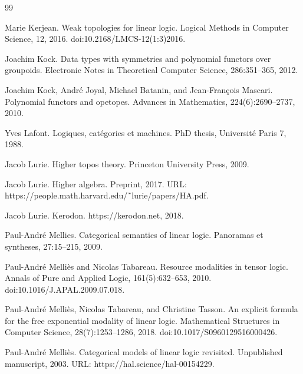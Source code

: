 \begin{thebibliography}{99}
\par\noindent    Marie Kerjean.  Weak topologies for linear logic.  Logical Methods in Computer Science, 12, 2016.  doi:10.2168/LMCS-12(1:3)2016.  

\par\noindent    Joachim Kock.  Data types with symmetries and polynomial functors over groupoids.  Electronic Notes in Theoretical Computer Science, 286:351–365, 2012.  

\par\noindent    Joachim Kock, André Joyal, Michael Batanin, and Jean-François Mascari.  Polynomial functors and opetopes.  Advances in Mathematics, 224(6):2690–2737, 2010.  

\par\noindent    Yves Lafont.  Logiques, catégories et machines.  PhD thesis, Université Paris 7, 1988.  

\par\noindent    Jacob Lurie.  Higher topos theory.  Princeton University Press, 2009.  

\par\noindent    Jacob Lurie.  Higher algebra.  Preprint, 2017.  URL: https://people.math.harvard.edu/˜lurie/papers/HA.pdf.  

\par\noindent    Jacob Lurie.  Kerodon.  https://kerodon.net, 2018.  

\par\noindent    Paul-André Mellies.  Categorical semantics of linear logic.  Panoramas et syntheses, 27:15–215, 2009.  

\par\noindent    Paul-André Melliès and Nicolas Tabareau.  Resource modalities in tensor logic.  Annals of Pure and Applied Logic, 161(5):632–653, 2010.  doi:10.1016/J.APAL.2009.07.018.  

\par\noindent    Paul-André Melliès, Nicolas Tabareau, and Christine Tasson.  An explicit formula for the free exponential modality of linear logic.  Mathematical Structures in Computer Science, 28(7):1253–1286, 2018.  doi:10.1017/S0960129516000426.  

\par\noindent    Paul-André Melliès.  Categorical models of linear logic revisited.  Unpublished manuscript, 2003.  URL: https://hal.science/hal-00154229.  


\end{thebibliography}
